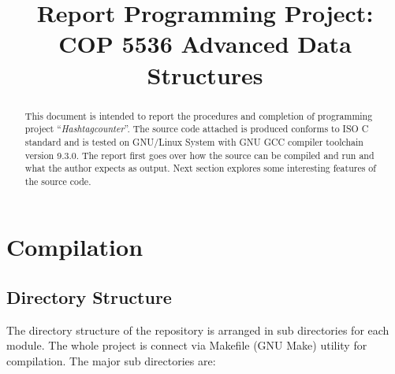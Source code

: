 \documentclass[conference,a4paper,12pt]{IEEEtran}
\begin{document}
\title{Report Programming Project: COP 5536 Advanced Data Structures}

\author{
}

\maketitle

\begin{abstract}
This document is intended to report the procedures and completion of programming project ``\textit{Hashtagcounter}''. The source code attached is produced conforms to ISO C standard and is tested on GNU/Linux System with GNU GCC compiler toolchain version 9.3.0.
	The report first goes over how the source can be compiled and run and what the author expects as output. Next section explores some interesting features of the source code.
\end{abstract}

\section{Compilation}
	
	\subsection{Directory Structure}
	The directory structure of the repository is arranged in sub directories for each module. The whole project is connect via Makefile (GNU Make) utility for compilation. The major sub directories are:
\end{document}
